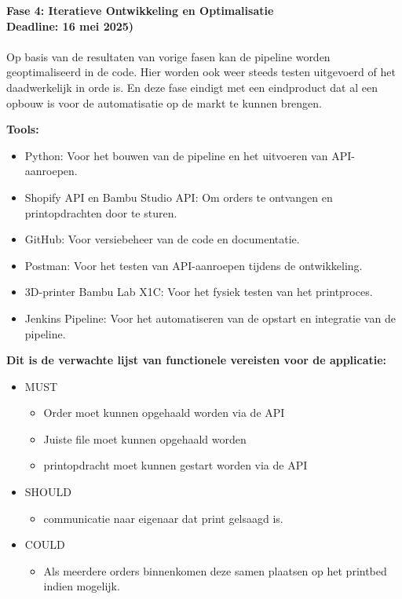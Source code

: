 \textbf{Fase 4: Iteratieve Ontwikkeling en Optimalisatie}\\
\textbf{Deadline: 16 mei 2025)}\\\\
Op basis van de resultaten van vorige fasen kan de pipeline worden geoptimaliseerd in de code. Hier worden ook weer steeds testen uitgevoerd of het daadwerkelijk in orde is. En deze fase eindigt met een eindproduct dat al een opbouw  is voor de automatisatie op de markt te kunnen brengen.  

\vspace{1em}
\textbf{Tools:}\\
\begin{itemize}
\item Python: Voor het bouwen van de pipeline en het uitvoeren van API-aanroepen.
\item Shopify API en Bambu Studio API: Om orders te ontvangen en printopdrachten door te sturen.
\item GitHub: Voor versiebeheer van de code en documentatie.
\item Postman: Voor het testen van API-aanroepen tijdens de ontwikkeling.
\item 3D-printer Bambu Lab X1C: Voor het fysiek testen van het printproces.
\item Jenkins Pipeline: Voor het automatiseren van de opstart en integratie van de pipeline.
\end{itemize}

\vspace{1em}
\textbf{Dit is de verwachte lijst van functionele vereisten voor de applicatie:}\\
\begin{itemize}
    \item MUST
    \begin{itemize}
        \item Order moet kunnen opgehaald worden  via de API
        \item Juiste file moet kunnen opgehaald worden
        \item printopdracht moet kunnen gestart worden via de API
    \end{itemize}
    \item SHOULD
    \begin{itemize}
        \item communicatie naar eigenaar dat print gelsaagd is.
    \end{itemize}
    \item COULD
    \begin{itemize}
        \item Als meerdere orders binnenkomen deze samen plaatsen op het printbed indien mogelijk.
    \end{itemize}
\end{itemize}

